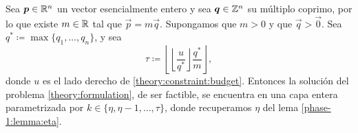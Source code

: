 \begin{lemma}
	\label{lemma:tau}
	Sea $\boldsymbol{p} \in \mathbb{R}^n$ un vector esencialmente entero y sea $\boldsymbol{q} \in \mathbb{Z}^n$ su múltiplo
	coprimo, por lo que existe $m \in \mathbb{R}$ tal que $\vec{p} = m\vec{q}$. Supongamos que $m > 0$ y que
	$\vec{q} > \vec{0}$. Sea $q^* \coloneq \max\lbrace q_1, \ldots, q_n \rbrace$, y sea
	\begin{equation}
		\label{eq:tau}
		\tau \coloneq \left\lfloor \left\lfloor \frac{u}{q^*} \right\rfloor
			\frac{q^*}{m} \right\rfloor,
	\end{equation}
	donde $u$ es el lado derecho de \eqref{theory:constraint:budget}. Entonces la solución del
	problema \eqref{theory:formulation}, de ser factible, se encuentra en una capa entera
	parametrizada por $k \in \lbrace \eta, \eta - 1, \ldots, \tau \rbrace$, donde recuperamos $\eta$
	del lema \ref{phase-1:lemma:eta}.
\end{lemma}
